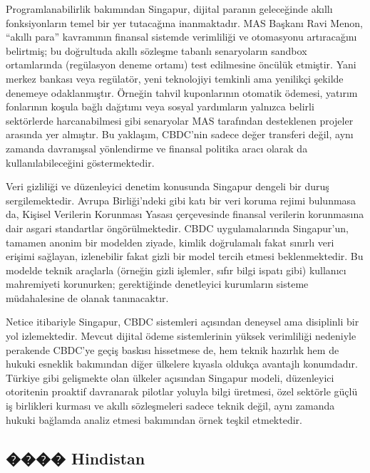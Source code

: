 \documentclass[a4paper,12pt]{article}
\begin{document}
Programlanabilirlik bakımından Singapur, dijital paranın geleceğinde akıllı fonksiyonların temel bir yer tutacağına inanmaktadır. MAS Başkanı Ravi Menon, “akıllı para” kavramının finansal sistemde verimliliği ve otomasyonu artıracağını belirtmiş; bu doğrultuda akıllı sözleşme tabanlı senaryoların sandbox ortamlarında (regülasyon deneme ortamı) test edilmesine öncülük etmiştir. Yani merkez bankası veya regülatör, yeni teknolojiyi temkinli ama yenilikçi şekilde denemeye odaklanmıştır. Örneğin tahvil kuponlarının otomatik ödemesi, yatırım fonlarının koşula bağlı dağıtımı veya sosyal yardımların yalnızca belirli sektörlerde harcanabilmesi gibi senaryolar MAS tarafından desteklenen projeler arasında yer almıştır. Bu yaklaşım, CBDC’nin sadece değer transferi değil, aynı zamanda davranışsal yönlendirme ve finansal politika aracı olarak da kullanılabileceğini göstermektedir.

Veri gizliliği ve düzenleyici denetim konusunda Singapur dengeli bir duruş sergilemektedir. Avrupa Birliği’ndeki gibi katı bir veri koruma rejimi bulunmasa da, Kişisel Verilerin Korunması Yasası çerçevesinde finansal verilerin korunmasına dair asgari standartlar öngörülmektedir. CBDC uygulamalarında Singapur’un, tamamen anonim bir modelden ziyade, kimlik doğrulamalı fakat sınırlı veri erişimi sağlayan, izlenebilir fakat gizli bir model tercih etmesi beklenmektedir. Bu modelde teknik araçlarla (örneğin gizli işlemler, sıfır bilgi ispatı gibi) kullanıcı mahremiyeti korunurken; gerektiğinde denetleyici kurumların sisteme müdahalesine de olanak tanınacaktır.

Netice itibariyle Singapur, CBDC sistemleri açısından deneysel ama disiplinli bir yol izlemektedir. Mevcut dijital ödeme sistemlerinin yüksek verimliliği nedeniyle perakende CBDC’ye geçiş baskısı hissetmese de, hem teknik hazırlık hem de hukuki esneklik bakımından diğer ülkelere kıyasla oldukça avantajlı konumdadır. Türkiye gibi gelişmekte olan ülkeler açısından Singapur modeli, düzenleyici otoritenin proaktif davranarak pilotlar yoluyla bilgi üretmesi, özel sektörle güçlü iş birlikleri kurması ve akıllı sözleşmeleri sadece teknik değil, aynı zamanda hukuki bağlamda analiz etmesi bakımından örnek teşkil etmektedir.


\subsection{���� Hindistan}
\end{document}
